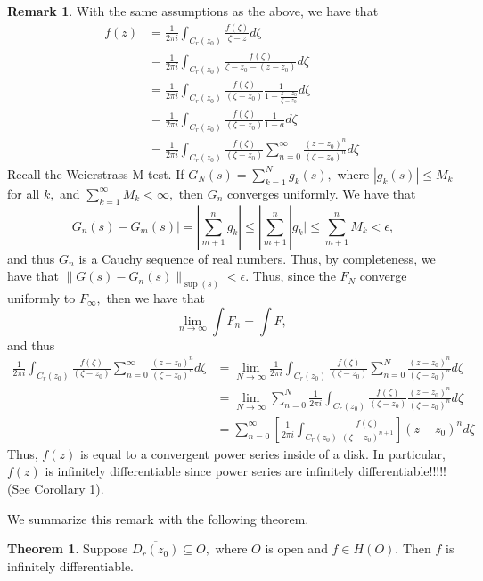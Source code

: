 \documentclass[10pt, oneside]{article}
\theoremstyle{definition}
\newtheorem{thm}{Theorem}
\newtheorem{rem}{Remark}
\begin{document}
\begin{rem}
    With the same assumptions as the above, we have that 
    \begin{align*}
    f(z) &= \frac{1}{2\pi i }\int_{C_r(z_0)}\frac{f(\zeta)}{\zeta - z}d\zeta\\
    &= \frac{1}{2\pi i }\int_{C_r(z_0)}\frac{f(\zeta)}{\zeta - z_0 - (z - z_0)}d\zeta\\
    &= \frac{1}{2\pi i }\int_{C_r(z_0)}\frac{f(\zeta)}{(\zeta - z_0)} \frac{1}{1 - \frac{z-z_0}{\zeta - z_0}}d\zeta \\
    &= \frac{1}{2\pi i }\int_{C_r(z_0)}\frac{f(\zeta)}{(\zeta - z_0)} \frac{1}{1 - a}d\zeta\\
    &=\frac{1}{2\pi i }\int_{C_r(z_0)}\frac{f(\zeta)}{(\zeta - z_0)} \sum_{n=0}^\infty \frac{(z - z_0)^n}{(\zeta - z_0)^n}d\zeta
    \end{align*}
Recall the Weierstrass M-test. If $G_N(s) = \sum_{k=1}^N g_k(s),$ where $|g_k(s)| \leq M_k$ for all $k,$ and $\sum_{k=1}^\infty M_k < \infty,$ then $G_n$ converges uniformly. We have that 
\[\left|G_n(s) - G_m(s)\right|  = |\sum_{m+1}^n g_k| \leq |\sum_{m+1}^n |g_k| \leq \sum_{m+1}^n M_k < \epsilon,\] and thus $G_n$ is a Cauchy sequence of real numbers. Thus, by completeness, we have that $\|G(s) - G_n(s)\|_{\sup (s)} < \epsilon.$ Thus, since the $F_N$ converge uniformly to $F_\infty,$ then we have that 
\[\lim_{n\to \infty} \int F_n = \int F,\] and thus 
\begin{align*}
    \frac{1}{2\pi i }\int_{C_r(z_0)}\frac{f(\zeta)}{(\zeta - z_0)} \sum_{n=0}^\infty \frac{(z - z_0)^n}{(\zeta - z_0)^n}d\zeta &= \lim_{N \to \infty} \frac{1}{2\pi i }\int_{C_r(z_0)}\frac{f(\zeta)}{(\zeta - z_0)} \sum_{n=0}^N\frac{(z - z_0)^n}{(\zeta - z_0)^n}d\zeta\\
    &= \lim_{N\to \infty} \sum_{n=0}^N\frac{1}{2\pi i }\int_{C_r(z_0)}\frac{f(\zeta)}{(\zeta - z_0)}  \frac{(z - z_0)^n}{(\zeta - z_0)^n}d\zeta\\
    &= \sum_{n=0}^\infty \left[\frac{1}{2\pi i }\int_{C_r(z_0)}\frac{f(\zeta)}{(\zeta - z_0)^{n+1}}\right]  (z - z_0)^nd\zeta
\end{align*}
Thus, $f(z)$ is equal to a convergent power series inside of a disk. In particular, $f(z)$ is infinitely differentiable since power series are infinitely differentiable!!!!! (See Corollary 1).
\end{rem}
We summarize this remark with the following theorem.
\begin{thm}
    Suppose $\overline{D_r(z_0)} \subseteq O,$ where $O$ is open and $f\in H(O).$ Then $f$ is infinitely differentiable. 
\end{thm}
\end{document}
